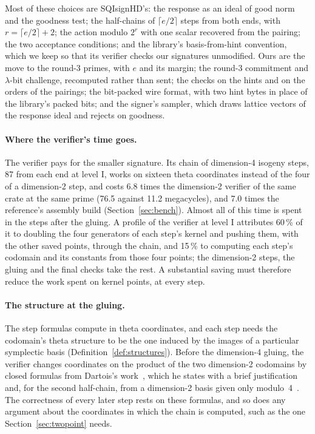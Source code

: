 \documentclass[version=preprint]{iacrcc}
\begin{document}
    Most of these choices are SQIsignHD's: the response as an ideal of good
    norm and the goodness test; the half-chains of $\lceil e/2 \rceil$ steps
    from both ends, with $r = \lceil e/2 \rceil + 2$; the action modulo $2^r$
    with one scalar recovered from the pairing; the two acceptance conditions;
    and the library's basis-from-hint convention, which we keep so that its
    verifier checks our signatures unmodified. Ours are the move to the round-3
    primes, with $e$ and its margin; the round-3 commitment and $\lambda$-bit
    challenge, recomputed rather than sent; the checks on the hints and on the
    orders of the pairings; the bit-packed wire format, with two hint bytes in
    place of the library's packed bits; and the signer's sampler, which draws
    lattice vectors of the response ideal and rejects on goodness.

    \paragraph{Where the verifier's time goes.}
    The verifier pays for the smaller signature. Its chain of dimension-4
    isogeny steps, 87 from each end at level I, works on sixteen theta
    coordinates instead of the four of a dimension-2 step, and costs 6.8 times
    the dimension-2 verifier of the same crate at the same prime (76.5 against
    11.2 megacycles), and 7.0 times the reference's assembly build
    (Section~\ref{sec:bench}). Almost all of this time is spent in the steps
    after the gluing. A profile of the verifier at level I attributes 60\,\%
    of it to doubling the four generators of each step's kernel and pushing
    them, with the other saved points, through the chain, and 15\,\% to
    computing each step's codomain and its constants from those four points;
    the dimension-2 steps, the gluing and the final checks take the rest. A
    substantial saving must therefore reduce the work spent on kernel points,
    at every step.

    \paragraph{The structure at the gluing.}
    The step formulas compute in theta coordinates, and each step needs the
    codomain's theta structure to be the one induced by the images of a
    particular symplectic basis (Definition~\ref{def:structures}). Before the
    dimension-4 gluing, the verifier changes coordinates on the product of the
    two dimension-2 codomains by closed formulas from Dartois's
    work~\cite[Lemmas 30 and 31]{Dar24}, which he states with a brief
    justification and, for the second half-chain, from a dimension-2 basis
    given only modulo~4~\cite[Appendix C.1]{Dar24}. The correctness of every
    later step rests on these formulas, and so does any argument about the
    coordinates in which the chain is computed, such as the one
    Section~\ref{sec:twopoint} needs.
\end{document}
